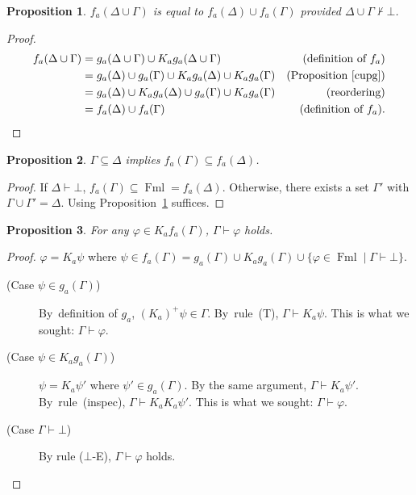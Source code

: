 \documentclass[doctor]{iscs-thesis}
\newcommand{\fml}{\operatorname{Fml}}
\newtheorem{proposition}{Proposition}
\begin{document}
\begin{proposition}
 \label{cupf}
 $f_a(\Delta\cup \Gamma)$ is equal to
 $f_a(\Delta)\cup f_a(\Gamma)$ provided $\Delta\cup\Gamma\not\vdash\bot$.
\end{proposition}
\begin{proof}
 \begin{align*}
  f_a(\Delta\cup\Gamma)& = g_a(\Delta\cup\Gamma)\cup K_ag_a(\Delta\cup\Gamma)
  &\text{(definition of $f_a$)}\\
  &= g_a(\Delta)\cup g_a(\Gamma)\cup K_ag_a(\Delta)\cup K_ag_a(\Gamma)
  &\text{(Proposition~\ref{cupg})}\\
  &= g_a(\Delta)\cup K_ag_a(\Delta)\cup g_a(\Gamma)\cup K_ag_a(\Gamma)
  &\text{(reordering)}\\
  &= f_a(\Delta)\cup f_a(\Gamma)
  &\text{(definition of $f_a$)}.
 \end{align*}
\end{proof}

\begin{proposition}
 \label{f_mono}
 $\Gamma\subseteq \Delta$ implies $f_a(\Gamma)\subseteq f_a(\Delta)$.
\end{proposition}
\begin{proof}
 If $\Delta\vdash\bot$, $f_a(\Gamma)\subseteq \fml = f_a(\Delta)$.
 Otherwise, 
 there exists a set $\Gamma'$ with $\Gamma\cup \Gamma' = \Delta$.
 Using Proposition~\ref{cupf} suffices.
\end{proof}

\begin{proposition}
 \label{wakame}
 For any $\varphi\in K_af_a(\Gamma)$, $\Gamma\vdash\varphi$ holds.
\end{proposition}
\begin{proof}
 $\varphi = K_a\psi$ where $\psi\in f_a(\Gamma) = g_a(\Gamma)\cup K_ag_a(\Gamma)\cup
 \{\varphi\in\fml\mid\Gamma\vdash\bot\}$.
 \begin{description}
  \item[ (Case $\psi\in g_a(\Gamma)$)]
	     By~definition of $g_a$, $(K_a)^+\psi\in \Gamma$.
	     By~rule~(T), $\Gamma\vdash K_a\psi$.
	     This is what we sought: $\Gamma\vdash\varphi$.
  \item[ (Case $\psi\in K_ag_a(\Gamma)$)]
	     $\psi = K_a\psi'$ where $\psi'\in g_a(\Gamma)$.
	     By the same argument, $\Gamma\vdash K_a\psi'$.
	     By~rule~(inspec), $\Gamma\vdash K_aK_a\psi'$.
	     This is what we sought: $\Gamma\vdash\varphi$.
  \item[ (Case $\Gamma\vdash\bot$)]
	     By rule ($\bot$-E), $\Gamma\vdash\varphi$ holds.
 \end{description}
\end{proof}
\end{document}
